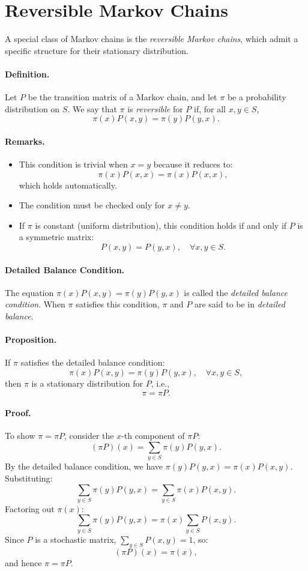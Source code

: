 \section{Reversible Markov Chains}
A special class of Markov chains is the \textit{reversible Markov chains}, which admit a specific structure for their stationary distribution.

\paragraph{Definition.}
Let \( P \) be the transition matrix of a Markov chain, and let \( \pi \) be a probability distribution on \( S \). We say that \( \pi \) is \textit{reversible} for \( P \) if, for all \( x, y \in S \),
\[
\pi(x) P(x, y) = \pi(y) P(y, x).
\]

\paragraph{Remarks.}
\begin{itemize}
    \item This condition is trivial when \( x = y \) because it reduces to:
    \[
    \pi(x) P(x, x) = \pi(x) P(x, x),
    \]
    which holds automatically.
    \item The condition must be checked only for \( x \neq y \).
    \item If \( \pi \) is constant (uniform distribution), this condition holds if and only if \( P \) is a symmetric matrix:
    \[
    P(x, y) = P(y, x), \quad \forall x, y \in S.
    \]
\end{itemize}

\paragraph{Detailed Balance Condition.}
The equation \( \pi(x) P(x, y) = \pi(y) P(y, x) \) is called the \textit{detailed balance condition}. When \( \pi \) satisfies this condition, \( \pi \) and \( P \) are said to be in \textit{detailed balance}.

\paragraph{Proposition.}
If \( \pi \) satisfies the detailed balance condition:
\[
\pi(x) P(x, y) = \pi(y) P(y, x), \quad \forall x, y \in S,
\]
then \( \pi \) is a stationary distribution for \( P \), i.e.,
\[
\pi = \pi P.
\]

\paragraph{Proof.}
To show \( \pi = \pi P \), consider the \( x \)-th component of \( \pi P \):
\[
(\pi P)(x) = \sum_{y \in S} \pi(y) P(y, x).
\]
By the detailed balance condition, we have \( \pi(y) P(y, x) = \pi(x) P(x, y) \). Substituting:
\[
\sum_{y \in S} \pi(y) P(y, x) = \sum_{y \in S} \pi(x) P(x, y).
\]
Factoring out \( \pi(x) \):
\[
\sum_{y \in S} \pi(y) P(y, x) = \pi(x) \sum_{y \in S} P(x, y).
\]
Since \( P \) is a stochastic matrix, \( \sum_{y \in S} P(x, y) = 1 \), so:
\[
(\pi P)(x) = \pi(x),
\]
and hence \( \pi = \pi P \).

